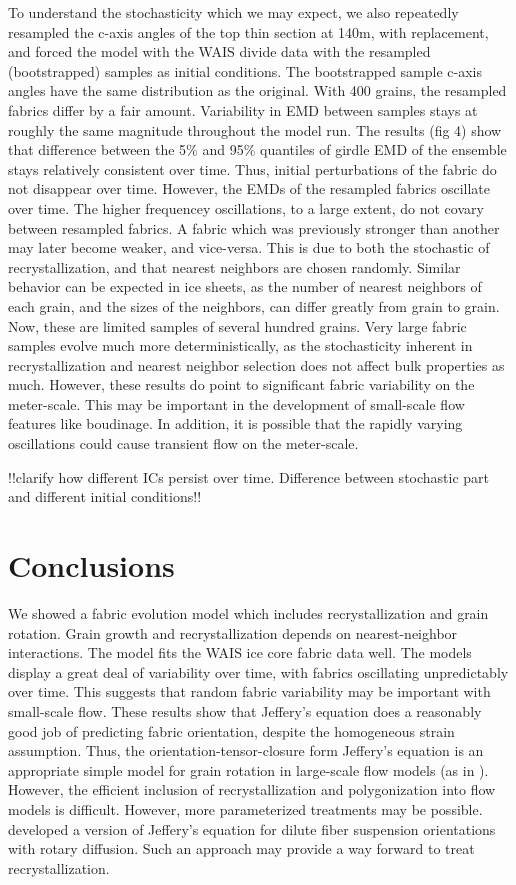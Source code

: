 \documentclass{igs}
\begin{document}
To understand the stochasticity which we may expect, we also repeatedly resampled the c-axis angles of the top thin section at 140m, with replacement, and forced the model with the WAIS divide data with the resampled (bootstrapped) samples as initial conditions. The bootstrapped sample c-axis angles have the same distribution as the original. With 400 grains, the resampled fabrics differ by a fair amount. Variability in EMD between samples stays at roughly the same magnitude throughout the model run. The results (fig 4) show that difference between the 5\% and 95\% quantiles of girdle EMD of the ensemble stays relatively consistent over time. Thus, initial perturbations of the fabric do not disappear over time.  However, the EMDs of the resampled fabrics oscillate over time. The higher frequencey oscillations, to a large extent, do not covary between resampled fabrics. A fabric which was previously stronger than another may later become weaker, and vice-versa. This is due to both the stochastic of recrystallization, and that nearest neighbors are chosen randomly. Similar behavior can be expected in ice sheets, as the number of nearest neighbors of each grain, and the sizes of the neighbors, can differ greatly from grain to grain. Now, these are limited samples of several hundred grains. Very large fabric samples evolve much more deterministically, as the stochasticity inherent in recrystallization and nearest neighbor selection does not affect bulk properties as much. However, these results do point to significant fabric variability on the meter-scale. This may be important in the development of small-scale flow features like boudinage. In addition, it is possible that the rapidly varying oscillations could cause transient flow on the meter-scale. 

!!clarify how different ICs persist over time. Difference between stochastic part and different initial conditions!!
\section{Conclusions}
We showed a fabric evolution model which includes recrystallization and grain rotation. Grain growth and recrystallization depends on nearest-neighbor interactions. The model fits the WAIS ice core fabric data well. The models display a great deal of variability over time, with fabrics oscillating unpredictably over time. This suggests that random fabric variability may be important with small-scale flow. These results show that Jeffery's equation does a reasonably good job of predicting fabric orientation, despite the homogeneous strain assumption. Thus, the orientation-tensor-closure form  Jeffery's equation is an appropriate simple model for grain rotation in large-scale flow models (as in \citet{gillet2006}). However, the efficient inclusion of recrystallization and polygonization into flow models is difficult. However, more parameterized treatments may be possible. \citet{folgar1984} developed a version of Jeffery's equation for dilute fiber suspension orientations with rotary diffusion. Such an approach may provide a way forward to treat recrystallization. 
\end{document}
